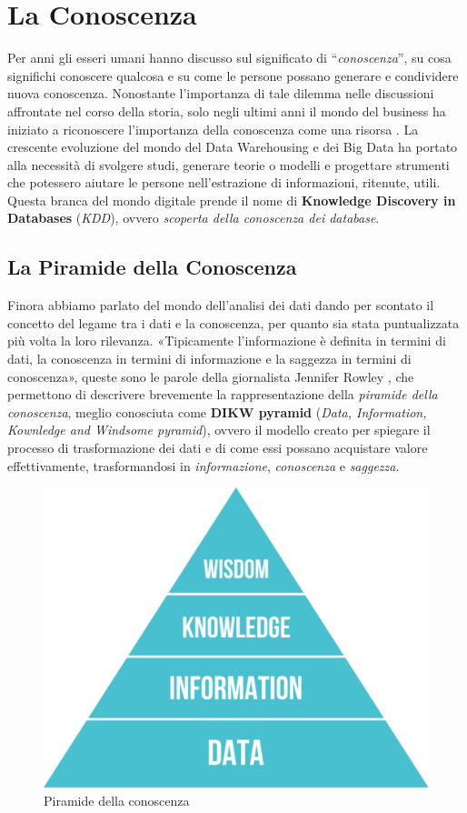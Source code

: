 
\section{La Conoscenza}

Per anni gli esseri umani hanno discusso sul significato di “\textit{conoscenza}”, su cosa significhi conoscere qualcosa e su come le persone possano generare e condividere nuova conoscenza. Nonostante l'importanza di tale dilemma nelle discussioni affrontate nel corso della storia, solo negli ultimi anni il mondo del business ha iniziato a riconoscere l'importanza della conoscenza come una risorsa \cite{knowledge_management_tools}.
La crescente evoluzione del mondo del Data Warehousing e dei Big Data ha portato alla necessità di svolgere studi, generare teorie o modelli e progettare strumenti che potessero aiutare le persone nell'estrazione di informazioni, ritenute, utili. Questa branca del mondo digitale prende il nome di \textbf{Knowledge Discovery in Databases} (\textit{KDD}), ovvero \textit{scoperta della conoscenza dei database}.

\subsection{La Piramide della Conoscenza}
Finora abbiamo parlato del mondo dell'analisi dei dati dando per scontato il concetto del legame tra i dati e la conoscenza, per quanto sia stata puntualizzata più volta la loro rilevanza. «Tipicamente l'informazione è definita in termini di dati, la conoscenza in termini di informazione e la saggezza in termini di conoscenza», queste sono le parole della giornalista Jennifer Rowley \cite{rowley_dikw_hierarchy}, che permettono di descrivere brevemente la rappresentazione della \textit{piramide della conoscenza}, meglio conosciuta come \textbf{DIKW pyramid} (\textit{Data, Information, Kownledge and Windsome pyramid}), ovvero il modello creato per spiegare il processo di trasformazione dei dati e di come essi possano acquistare valore effettivamente, trasformandosi in \textit{informazione}, \textit{conoscenza} e \textit{saggezza}.

\begin{figure}[H]
    \centering
    \includegraphics[width=0.6\linewidth]{figure//capitolo_3/DIKW Pyramid.pdf}
    \caption{Piramide della conoscenza}
    \label{fig:DIKW Pyramid}
\end{figure}

